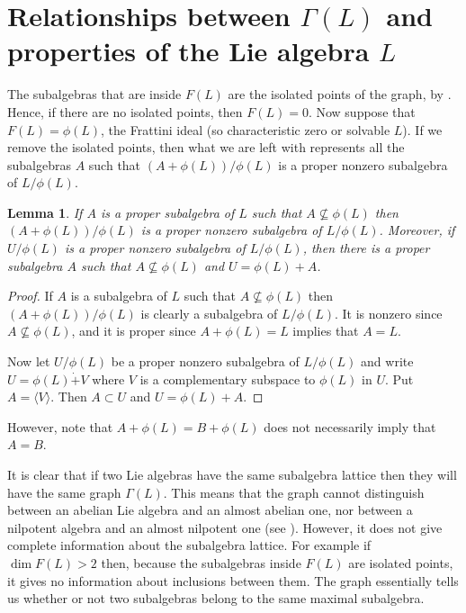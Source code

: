 \documentclass[11pt]{amsart}
\theoremstyle{plain}
\newtheorem{lemma}[theorem]{Lemma}
\begin{document}
\section{Relationships between $\Gamma(L)$ and properties of the Lie algebra $L$}
The subalgebras that are inside $F(L)$ are the isolated points of the graph, by \cite[Lemma 3.2]{TZG}. Hence, if there are no isolated points, then $F(L)=0$. Now suppose that $F(L)=\phi(L)$, the Frattini ideal (so characteristic zero or solvable $L$). If we remove the isolated points, then what we are left with represents all the subalgebras $A$ such that $(A+\phi(L))/\phi(L)$ is a proper nonzero subalgebra of $L/\phi(L)$.

\begin{lemma} \label{5.1}
If $A$ is a proper subalgebra of $L$ such that $A\not\subseteq \phi(L)$ then $(A+\phi(L))/\phi(L)$ is a proper nonzero subalgebra of $L/\phi(L)$. Moreover, if $U/\phi(L)$ is a proper nonzero subalgebra of $L/\phi(L)$, then there is a proper subalgebra $A$ such that $A\not\subseteq \phi(L)$ and $U=\phi(L)+A$.
\end{lemma}
\begin{proof}  If $A$ is a subalgebra of $L$ such that $A\not\subseteq \phi(L)$ then $(A+\phi(L))/\phi(L)$ is clearly a subalgebra of $L/\phi(L)$. It is nonzero since $A\not\subseteq \phi(L)$, and it is proper since $A+\phi(L)=L$ implies that $A=L$.
\par

Now let $U/\phi(L)$ be a proper nonzero subalgebra of $L/\phi(L)$ and write $U=\phi(L)\dot{+} V$ where $V$ is a complementary subspace to $\phi(L)$ in $U$. Put $A=\langle V\rangle$. Then $A\subset U$ and $U=\phi(L)+A$.
\end{proof}
\medskip

However, note that $A+\phi(L)=B+\phi(L)$ does not necessarily imply that $A=B$. 
\par

It is clear that if two Lie algebras have the same subalgebra lattice then they will have the same graph $\Gamma(L)$. This means that the graph cannot distinguish between an abelian Lie algebra and an almost abelian one, nor between a nilpotent algebra and an almost nilpotent one (see \cite{tow}). However, it does not give complete information about the subalgebra lattice. For example if $\dim F(L)>2$ then, because the subalgebras inside $F(L)$ are isolated points, it gives no information about inclusions between them. The graph essentially tells us whether or not two subalgebras belong to the same maximal subalgebra. 
\par
\end{document}
